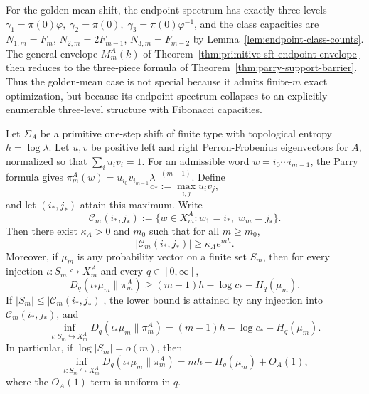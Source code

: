 \begin{remark}
\label{rem:golden-mean-as-special-case}
For the golden-mean shift, the endpoint spectrum has exactly three levels
\(\gamma_1=\pi(0)\varphi,\;\gamma_2=\pi(0),\;\gamma_3=\pi(0)\varphi^{-1}\),
and the class capacities are \(N_{1,m}=F_m\),
\(N_{2,m}=2F_{m-1}\), \(N_{3,m}=F_{m-2}\) by
Lemma~\ref{lem:endpoint-class-counts}. The general envelope \(M_m^A(k)\)
of Theorem~\ref{thm:primitive-sft-endpoint-envelope} then reduces to the
three-piece formula of Theorem~\ref{thm:parry-support-barrier}. Thus the
golden-mean case is not special because it admits finite-\(m\) exact
optimization, but because its endpoint spectrum collapses to an explicitly
enumerable three-level structure with Fibonacci capacities.
\end{remark}

\begin{theorem}
\label{thm:primitive-sft-injective-barrier}
Let \(\Sigma_A\) be a primitive one-step shift of finite type with topological
entropy \(h=\log\lambda\). Let \(u,v\) be positive left and right
Perron-Frobenius eigenvectors for \(A\), normalized so that
\(\sum_i u_i v_i=1\). For an admissible word \(w=i_0\cdots i_{m-1}\), the
Parry formula gives
\(\pi_m^A(w)=u_{i_0}v_{i_{m-1}}\lambda^{-(m-1)}\). Define
\[
c_*:=\max_{i,j}u_i v_j,
\]
and let \((i_*,j_*)\) attain this maximum. Write
\[
\mathcal C_m(i_*,j_*):=\{w\in X_m^A: w_1=i_*,\;w_m=j_*\}.
\]
Then there exist \(\kappa_A>0\) and \(m_0\) such that for all \(m\ge m_0\),
\[
|\mathcal C_m(i_*,j_*)|\ge \kappa_A e^{mh}.
\]
Moreover, if \(\mu_m\) is any probability vector on a finite set \(S_m\), then
for every injection \(\iota:S_m\hookrightarrow X_m^A\) and every
\(q\in[0,\infty]\),
\[
D_q(\iota_*\mu_m\|\pi_m^A)
\ge
(m-1)h-\log c_*-H_q(\mu_m).
\]
If \(|S_m|\le |\mathcal C_m(i_*,j_*)|\), the lower bound is attained by any
injection into \(\mathcal C_m(i_*,j_*)\), and
\[
\inf_{\iota:S_m\hookrightarrow X_m^A}D_q(\iota_*\mu_m\|\pi_m^A)
=
(m-1)h-\log c_*-H_q(\mu_m).
\]
In particular, if \(\log|S_m|=o(m)\), then
\[
\inf_{\iota:S_m\hookrightarrow X_m^A}D_q(\iota_*\mu_m\|\pi_m^A)
=
mh-H_q(\mu_m)+O_A(1),
\]
where the \(O_A(1)\) term is uniform in \(q\).
\end{theorem}

